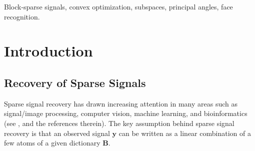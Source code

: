 \documentclass[10pt,twocolumn,twoside] {IEEEtran}
\begin{document}
\begin{IEEEkeywords}
Block-sparse signals, convex optimization, subspaces, principal angles, face recognition.
\end{IEEEkeywords}

\IEEEpeerreviewmaketitle

\section{Introduction}

\subsection{Recovery of Sparse Signals}

Sparse signal recovery has drawn increasing attention in many areas such as signal/image processing, computer vision, machine learning, and bioinformatics (see {}, \cite{Candes:SPM08, Wright:IEEEProc10, Elad:IEEEProc10, Parvaresh:STSP08} and the references therein). The key assumption behind sparse signal recovery is that an observed signal ${\boldsymbol{y}}$ can be written as a linear combination of a few atoms of a given dictionary ${\boldsymbol{B}}$. 
\end{document}
